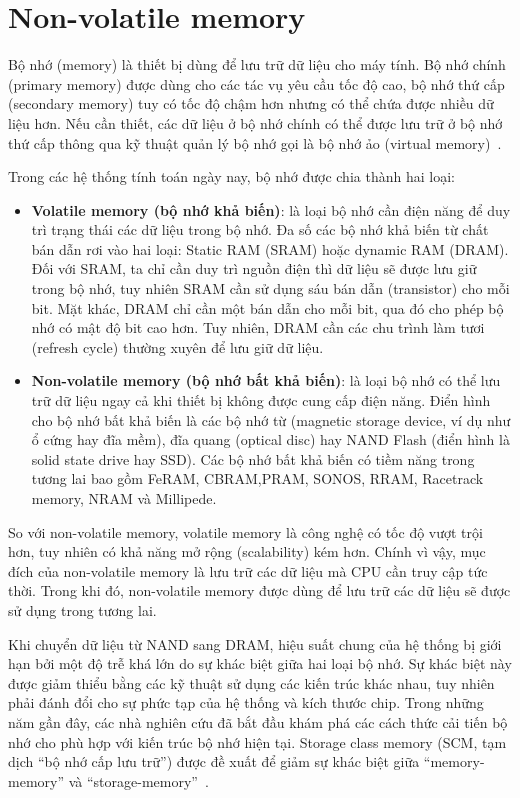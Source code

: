 \section{Non-volatile memory}
\label{chap:non-volatile-memory}

Bộ nhớ (memory) là thiết bị dùng để lưu trữ dữ liệu cho máy tính. Bộ nhớ chính
(primary memory) được dùng cho các tác vụ yêu cầu tốc độ cao, bộ nhớ thứ cấp
(secondary memory) tuy có tốc độ chậm hơn nhưng có thể chứa được nhiều dữ liệu
hơn. Nếu cần thiết, các dữ liệu ở bộ nhớ chính có thể được lưu trữ ở bộ nhớ thứ
cấp thông qua kỹ thuật quản lý bộ nhớ gọi là bộ nhớ ảo (virtual
memory)~\cite{VolatileNonVolatileComputer}.

Trong các hệ thống tính toán ngày nay, bộ nhớ được chia thành hai loại:

\begin{itemize}
    \item \textbf{Volatile memory (bộ nhớ khả biến)}: là loại bộ nhớ cần điện
    năng để duy trì trạng thái các dữ liệu trong bộ nhớ. Đa số các bộ nhớ khả
    biến từ chất bán dẫn rơi vào hai loại: Static RAM (SRAM) hoặc dynamic RAM
    (DRAM). Đối với SRAM, ta chỉ cần duy trì nguồn điện thì dữ liệu sẽ được lưu
    giữ trong bộ nhớ, tuy nhiên SRAM cần sử dụng sáu bán dẫn (transistor) cho
    mỗi bit. Mặt khác, DRAM chỉ cần một bán dẫn cho mỗi bit, qua đó cho phép bộ
    nhớ có mật độ bit cao hơn. Tuy nhiên, DRAM cần các chu trình làm tươi
    (refresh cycle) thường xuyên để lưu giữ dữ liệu.
    
    \item \textbf{Non-volatile memory (bộ nhớ bất khả biến)}: là loại bộ nhớ có
    thể lưu trữ dữ liệu ngay cả khi thiết bị không được cung cấp điện năng.
    Điển hình cho bộ nhớ bất khả biến là các bộ nhớ từ (magnetic storage
    device, ví dụ như ổ cứng hay đĩa mềm), đĩa quang (optical disc) hay NAND
    Flash (điển hình là solid state drive hay SSD). Các bộ nhớ bất khả biến có
    tiềm năng trong tương lai bao gồm FeRAM, CBRAM,PRAM, SONOS, RRAM, Racetrack
    memory, NRAM và Millipede.
\end{itemize}

So với non-volatile memory, volatile memory là công nghệ có tốc độ vượt trội
hơn, tuy nhiên có khả năng mở rộng (scalability) kém hơn. Chính vì vậy, mục
đích của non-volatile memory là lưu trữ các dữ liệu mà CPU cần truy cập tức
thời. Trong khi đó, non-volatile memory được dùng để lưu trữ các dữ liệu sẽ
được sử dụng trong tương lai.

Khi chuyển dữ liệu từ NAND sang DRAM, hiệu suất chung của hệ thống bị giới hạn
bởi một độ trễ khá lớn do sự khác biệt giữa hai loại bộ nhớ. Sự khác biệt này
được giảm thiểu bằng các kỹ thuật sử dụng các kiến trúc khác nhau, tuy nhiên
phải đánh đổi cho sự phức tạp của hệ thống và kích thước chip. Trong những năm
gần đây, các nhà nghiên cứu đã bắt đầu khám phá các cách thức cải tiến bộ nhớ
cho phù hợp với kiến trúc bộ nhớ hiện tại. Storage class memory (SCM, tạm dịch
``bộ nhớ cấp lưu trữ'') được đề xuất để giảm sự khác biệt giữa
``memory-memory'' và
``storage-memory''~\cite{gouxOxRAMTechnologyDevelopment2019}.

